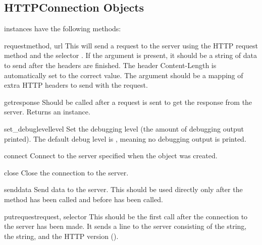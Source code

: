 \subsection{HTTPConnection Objects \label{httpconnection-objects}}

 instances have the following methods:

\begin{methoddesc}{request}{method, url}
This will send a request to the server using the HTTP request method
 and the selector .  If the  argument is
present, it should be a string of data to send after the headers are finished.
The header Content-Length is automatically set to the correct value.
The  argument should be a mapping of extra HTTP headers to send
with the request.
\end{methoddesc}

\begin{methoddesc}{getresponse}{}
Should be called after a request is sent to get the response from the server.
Returns an  instance.
\end{methoddesc}

\begin{methoddesc}{set_debuglevel}{level}
Set the debugging level (the amount of debugging output printed).
The default debug level is , meaning no debugging output is
printed.
\end{methoddesc}

\begin{methoddesc}{connect}{}
Connect to the server specified when the object was created.
\end{methoddesc}

\begin{methoddesc}{close}{}
Close the connection to the server.
\end{methoddesc}

\begin{methoddesc}{send}{data}
Send data to the server.  This should be used directly only after the
 method has been called and before
 has been called.
\end{methoddesc}

\begin{methoddesc}{putrequest}{request, selector}
This should be the first call after the connection to the server has
been made.  It sends a line to the server consisting of the
 string, the  string, and the HTTP version
().
\end{methoddesc}

